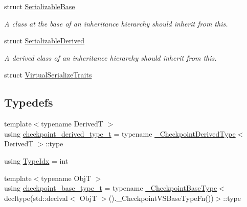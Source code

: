 \begin{DoxyCompactItemize}
\item 
struct \hyperlink{structcheckpoint_1_1dispatch_1_1vrt_1_1_serializable_base}{Serializable\+Base}
\begin{DoxyCompactList}\small\item\em A class at the base of an inheritance hierarchy should inherit from this. \end{DoxyCompactList}\item 
struct \hyperlink{structcheckpoint_1_1dispatch_1_1vrt_1_1_serializable_derived}{Serializable\+Derived}
\begin{DoxyCompactList}\small\item\em A derived class of an inheritance hierarchy should inherit from this. \end{DoxyCompactList}\item 
struct \hyperlink{structcheckpoint_1_1dispatch_1_1vrt_1_1_virtual_serialize_traits}{Virtual\+Serialize\+Traits}
\end{DoxyCompactItemize}
\subsection*{Typedefs}
\begin{DoxyCompactItemize}
\item 
{\footnotesize template$<$typename DerivedT $>$ }\\using \hyperlink{namespacecheckpoint_1_1dispatch_1_1vrt_a60969947b48a5cdd307a0986ae7e6a45}{checkpoint\+\_\+derived\+\_\+type\+\_\+t} = typename \hyperlink{structcheckpoint_1_1dispatch_1_1vrt_1_1___checkpoint_derived_type}{\+\_\+\+Checkpoint\+Derived\+Type}$<$ DerivedT $>$\+::type
\item 
using \hyperlink{namespacecheckpoint_1_1dispatch_1_1vrt_acd3f9e6b091bcfbc23dc35ea8ef45d3b}{Type\+Idx} = int
\item 
{\footnotesize template$<$typename ObjT $>$ }\\using \hyperlink{namespacecheckpoint_1_1dispatch_1_1vrt_a41abdf16741a7c58e926d9813985bd2f}{checkpoint\+\_\+base\+\_\+type\+\_\+t} = typename \hyperlink{structcheckpoint_1_1dispatch_1_1vrt_1_1___checkpoint_base_type}{\+\_\+\+Checkpoint\+Base\+Type}$<$ decltype(std\+::declval$<$ ObjT $>$().\+\_\+\+Checkpoint\+V\+S\+Base\+Type\+Fn())$>$\+::type
\end{DoxyCompactItemize}
